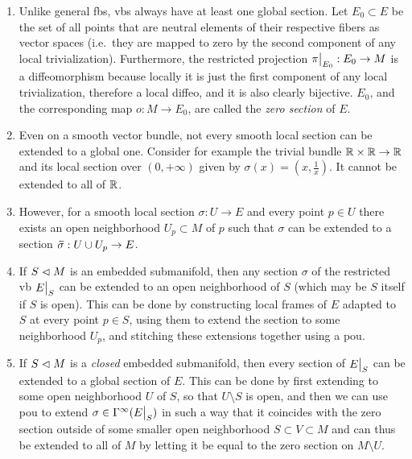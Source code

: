 \begin{rem}\label{rem zero section, extending section}
\begin{enumerate}
    \item Unlike general \glspl{fb}, \glspl{vb} always have at least one global section. Let $E_0\subset E$ be the set of all points that are neutral elements of their respective fibers as vector spaces (i.e.\ they are mapped to zero by the second component of any local trivialization). Furthermore, the restricted projection $\restr{\pi}{E_0}:E_0\to M$ is a diffeomorphism because locally it is just the first component of any local trivialization, therefore a local diffeo, and it is also clearly bijective. $E_0$, and the corresponding map $o:M\to E_0$, are called the \emph{zero section} of $E$.
    \item Even on a smooth vector bundle, not every smooth local section can be extended to a global one. Consider for example the trivial bundle $\mathbb{R}\times\mathbb{R}\to \mathbb{R}$ and its local section over $(0,+\infty)$ given by $\sigma(x)=(x,\frac 1x)$. It cannot be extended to all of $\mathbb{R}$. 
    \item However, for a smooth local section $\sigma:U\to E$ and every point $p\in U$ there exists an open neighborhood $U_p\subset M$ of $p$ such that $\sigma$ can be extended to a section $\wt{\sigma}:U\cup U_p\to E$.
    \item If $S\vartriangleleft M$ is an embedded submanifold, then any section $\sigma$ of the restricted \gls{vb} $\restr{E}{S}$ can be extended to an open neighborhood of $S$ (which may be $S$ itself if $S$ is open). This can be done by constructing local frames of $E$ adapted to $S$ at every point $p\in S$, using them to extend the section to some neighborhood $U_p$, and stitching these extensions together using a \gls{pou}.
    \item If $S\vartriangleleft M$ is a \emph{closed} embedded submanifold, then every section of $\restr{E}{S}$ can be extended to a global section of $E$. This can be done by first extending to some open neighborhood $U$ of $S$, so that $U\setminus S$ is open, and then we can use \gls{pou} to extend $\sigma\in\Gamma^\infty(\restr{E}{S})$ in such a way that it coincides with the zero section outside of some smaller open neighborhood $S\subset V\subset M$ and can thus be extended to all of $M$ by letting it be equal to the zero section on $M\setminus U$.
\end{enumerate}
\end{rem}


